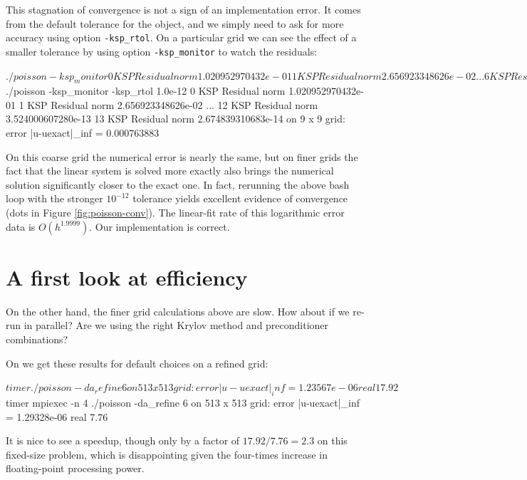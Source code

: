 This stagnation of convergence is not a sign of an implementation error.  It comes from the default tolerance for the \pKSP object, and we simply need to ask for more accuracy using option \texttt{-ksp\_rtol}.  On a particular grid we can see the effect of a smaller tolerance by using option \texttt{-ksp\_monitor} to watch the residuals:
\begin{cline}
$ ./poisson -ksp_monitor
  0 KSP Residual norm 1.020952970432e-01 
  1 KSP Residual norm 2.656923348626e-02 
...
  6 KSP Residual norm 2.152764600588e-06 
  7 KSP Residual norm 2.650467236964e-07 
on 9 x 9 grid:  error |u-uexact|_inf = 0.000763959
$ ./poisson -ksp_monitor -ksp_rtol 1.0e-12
  0 KSP Residual norm 1.020952970432e-01 
  1 KSP Residual norm 2.656923348626e-02 
...
 12 KSP Residual norm 3.524000607280e-13 
 13 KSP Residual norm 2.674839310683e-14 
on 9 x 9 grid:  error |u-uexact|_inf = 0.000763883
\end{cline}
On this coarse grid the numerical error is nearly the same, but on finer grids the fact that the linear system is solved more exactly also brings the numerical solution significantly closer to the exact one.  In fact, rerunning the above bash loop with the stronger $10^{-12}$ tolerance yields excellent evidence of convergence (dots in Figure \ref{fig:poisson-conv}).  The linear-fit rate of this logarithmic error data is $O(h^{1.9999})$.  Our implementation is correct.


\section{A first look at efficiency}

On the other hand, the finer grid calculations above are slow.  How about if we re-run in parallel?  Are we using the right Krylov method and preconditioner combinations?

On \WORKSTATION we get these results for default choices on a refined grid:
\begin{cline}
$ timer ./poisson -da_refine 6 
on 513 x 513 grid:  error |u-uexact|_inf = 1.23567e-06
real 17.92
$ timer mpiexec -n 4 ./poisson -da_refine 6 
on 513 x 513 grid:  error |u-uexact|_inf = 1.29328e-06
real 7.76
\end{cline}
It is nice to see a speedup, though only by a factor of $17.92/7.76 = 2.3$ on this fixed-size problem, which is disappointing given the four-times increase in floating-point processing power.

